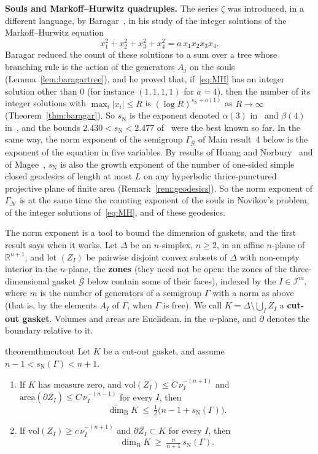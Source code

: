 \documentclass[11pt]{amsart}
\theoremstyle{definition}
\theoremstyle{remark}
\newcommand{\R}{\mathbb R}
\newcommand{\cI}{\mathcal I}
\newcommand{\GN}{\Gamma_{\mathcal N}}
\newcommand{\cG}{\mathcal G}
\newcommand{\GG}{\Gamma_{\mathcal G}}
\newcommand{\udimB}{\overline{\dim}_{\mathrm B}}
\newcommand{\sN}{s_{\mathrm N}}
\newcommand{\abs}[1]{\lvert #1\rvert}
\begin{document}
\medskip\noindent\textbf{Souls and Markoff--Hurwitz quadruples.}
The series $\zeta$ was introduced, in a different language, by Baragar~\cite{Bar98}, in his study of the integer solutions of the Markoff--Hurwitz equation
\begin{equation}\label{eq:MH}
  x_1^2+x_2^2+x_3^2+x_4^2=a\,x_1x_2x_3x_4 .
\end{equation}
Baragar reduced the count of these solutions to a sum over a tree whose branching rule is the action of the generators $A_j$ on the souls (Lemma~\ref{lem:baragartree}), and he proved that, if~\eqref{eq:MH} has an integer solution other than $0$ (for instance $(1,1,1,1)$ for $a=4$), then the number of its integer solutions with $\max_i\abs{x_i}\le R$ is $(\log R)^{\sN+o(1)}$ as $R\to\infty$ (Theorem~\ref{thm:baragar}). So $\sN$ is the exponent denoted $\alpha(3)$ in~\cite{Bar98} and $\beta(4)$ in~\cite{GMR19}, and the bounds $2.430<\sN<2.477$ of~\cite[Thm.~0.1]{Bar98} were the best known so far. In the same way, the norm exponent of the semigroup $\GG$ of Main result~4 below is the exponent of the equation in five variables. By results of Huang and Norbury~\cite{HN17} and of Magee~\cite{Mag20}, $\sN$ is also the growth exponent of the number of one-sided simple closed geodesics of length at most $L$ on any hyperbolic thrice-punctured projective plane of finite area (Remark~\ref{rem:geodesics}). So the norm exponent of $\GN$ is at the same time the counting exponent of the souls in Novikov's problem, of the integer solutions of~\eqref{eq:MH}, and of these geodesics.

The norm exponent is a tool to bound the dimension of gaskets, and the first result says when it works. Let $\Delta$ be an $n$-simplex, $n\ge2$, in an affine $n$-plane of $\R^{n+1}$, and let $(Z_I)$ be pairwise disjoint convex subsets of $\Delta$ with non-empty interior in the $n$-plane, the \textbf{zones} (they need not be open: the zones of the three-dimensional gasket $\cG$ below contain some of their faces), indexed by the $I\in\cI^m$, where $m$ is the number of generators of a semigroup $\Gamma$ with a norm as above (that is, by the elements $A_I$ of $\Gamma$, when $\Gamma$ is free). We call $K=\Delta\setminus\bigcup_IZ_I$ a \textbf{cut-out gasket}. Volumes and areas are Euclidean, in the $n$-plane, and $\partial$ denotes the boundary relative to it.

\begin{restatable}{theorem}{thmcutout}\label{thm:cutout}
Let $K$ be a cut-out gasket, and assume $n-1<\sN(\Gamma)<n+1$.
\begin{enumerate}
\item[(a)] If $K$ has measure zero, and $\mathrm{vol}(Z_I)\le C\,\nu_I^{-(n+1)}$ and $\mathrm{area}(\partial\overline{Z_I})\le C\,\nu_I^{-(n-1)}$ for every $I$, then
\[
  \udimB K\ \le\ \tfrac12\bigl(n-1+\sN(\Gamma)\bigr).
\]
\item[(b)] If $\mathrm{vol}(Z_I)\ge c\,\nu_I^{-(n+1)}$ and $\partial\overline{Z_I}\subset K$ for every $I$, then
\[
  \udimB K\ \ge\ \tfrac{n}{n+1}\,\sN(\Gamma).
\]
\end{enumerate}
\end{restatable}
\end{document}
